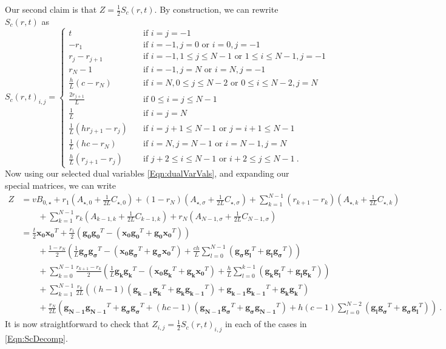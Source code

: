 \documentclass[11pt]{article}
\numberwithin{equation}{section}
\theoremstyle{definition}
\theoremstyle{definition}
\theoremstyle{definition}
\newcommand{\1}{\mathbf{1}}
\newcommand{\idxSpecial}{\sigma}
\newcommand{\g}[1]{\mathbf{g_{#1}}}
\renewcommand{\gg}[2]{\g{#1}\g{#2}^T + \g{#2}\g{#1}^T}
\newcommand{\gG}[1]{\g{#1}\g{#1}^T}
\newcommand{\xz}{\mathbf{x_0}}
\begin{document}
Our second claim is that $Z = \frac{1}{2}S_c(r,t)$. By construction, we can rewrite $S_c(r,t)$ as
\begin{equation}\label{Eqn:ScDecomp}
    S_c(r,t)_{i,j} = \begin{cases}
        t \quad & \text{if } i=j=-1 \\
        -r_1 \quad & \text{if } i=-1,j=0 \text{ or } i=0,j=-1\\
        r_j - r_{j+1} \quad & \text{if } i=-1, 1\leq j \leq N-1 \text{ or } 1\leq i \leq N-1,j=-1 \\
        r_N - 1 \quad & \text{if } i=-1, j=N \text{ or } i=N,j=-1 \\
        \frac{h}{L}(c-r_N) \quad & \text{if } i=N, 0\leq j \leq N-2 \text{ or } 0\leq i\leq N-2,j=N \\
        \frac{2r_{j+1}}{L} \quad & \text{if } 0\leq i=j \leq N-1 \\
        \frac{1}{L} \quad & \text{if } i=j=N \\
        \frac{1}{L}( hr_{j+1}-r_j) \quad & \text{if } i=j+1\leq N-1 \text{ or } j=i+1\leq N-1 \\
        \frac{1}{L}(hc-r_N) \quad & \text{if } i=N, j=N-1 \text{ or } i=N-1,j=N \\
        \frac{h}{L}(r_{j+1}-r_j) \quad & \text{if } j+2 \leq i \leq N-1  \text{ or } i+2 \leq j \leq N-1\ .
    \end{cases}
\end{equation}
Now using our selected dual variables \eqref{Eqn:dualVarVals}, and expanding our special matrices, we can write
\begin{align*}
    Z & = v B_{0,\star} + r_1\left(A_{\star,0} + \frac{1}{2L} C_{\star,0}\right) + (1-r_N)\left(A_{\star,\idxSpecial}+\frac{1}{2L}C_{\star,\idxSpecial}\right) + \sum_{k=1}^{N-1}(r_{k+1}-r_k)\left(A_{\star,k}+\frac{1}{2L}C_{\star,k}\right) \\
    & \qquad + \sum_{k=1}^{N-1} r_k\left(A_{k-1,k} + \frac{1}{2L}C_{k-1,k}\right) + r_N\left(A_{N-1,\idxSpecial} + \frac{1}{2L}C_{N-1,\idxSpecial}\right) \\
    & = \frac{t}{2} \xz \xz^T +\frac{r_1}{2}\left(\gG{0} -(\xz \g{0}^T + \g{0} \xz^T) \right) \\
    & \qquad  + \frac{1-r_N}{2}\left( \frac{1}{L}\gG{\idxSpecial} - (\xz \g{\idxSpecial}^T + \g{\idxSpecial} \xz^T) + \frac{ch}{L}\sum_{l=0}^{N-1} (\gg{\idxSpecial}{l}) \right)\\
    & \qquad + \sum_{k=0}^{N-1}\frac{r_{k+1}-r_k}{2}\left(\frac{1}{L}\gG{k} -(\xz \g{k}^T + \g{k} \xz^T) + \frac{h}{L}\sum_{l=0}^{k-1} (\gg{k}{l}) \right) \\
    & \qquad + \sum_{k=1}^{N-1} \frac{r_k}{2L} \left((h-1)(\gg{k-1}{k}) + \gG{k-1} + \gG{k}\right) \\
    & \qquad + \frac{r_N}{2L} \left(\gG{N-1} + \gG{\idxSpecial} + (hc-1) (\gg{N-1}{\idxSpecial}) + h(c-1)\sum_{l=0}^{N-2} (\gg{l}{\idxSpecial})\right) \ .
\end{align*}
It is now straightforward to check that $Z_{i,j} = \frac{1}{2}S_c(r,t)_{i,j}$ in each of the cases in \eqref{Eqn:ScDecomp}.
\end{document}
